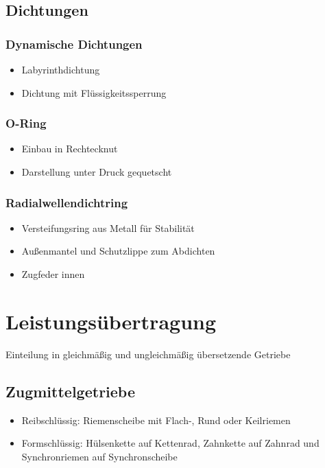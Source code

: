 \documentclass[a4paper,DIV=15,fontsize=11pt]{scrartcl}
\begin{document}
\subsection{Dichtungen}
\subsubsection{Dynamische Dichtungen}
\begin{itemize}
	\item Labyrinthdichtung
	\item Dichtung mit Flüssigkeitssperrung 
\end{itemize}
	
\subsubsection{O-Ring}
\begin{itemize}
	\item Einbau in Rechtecknut
	\item Darstellung unter Druck gequetscht
\end{itemize}
	
\subsubsection{Radialwellendichtring}
\begin{itemize}
	\item Versteifungsring aus Metall für Stabilität
	\item Außenmantel und Schutzlippe zum Abdichten
	\item Zugfeder innen
\end{itemize}
	
\section{Leistungsübertragung}
Einteilung in gleichmäßig und ungleichmäßig übersetzende Getriebe
\subsection{Zugmittelgetriebe}
\begin{itemize}
	\item Reibschlüssig: Riemenscheibe mit Flach-, Rund oder Keilriemen
	\item Formschlüssig: Hülsenkette auf Kettenrad, Zahnkette auf Zahnrad und Synchronriemen auf Synchronscheibe
\end{itemize}
	
\end{document}
